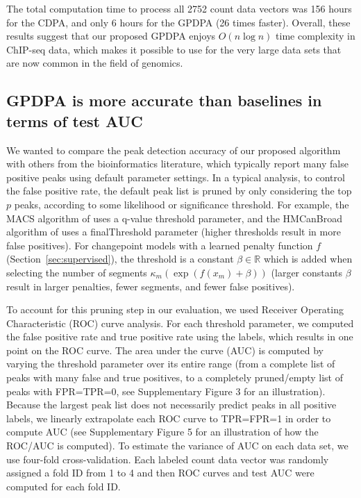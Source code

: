 \documentclass[twoside,11pt]{article}
\newcommand{\RR}{\mathbb R}
\begin{document}
The total computation time to process all 2752 count data vectors was
156 hours for the CDPA, and only 6 hours for the GPDPA (26 times
faster). Overall, these results suggest that our proposed GPDPA enjoys
$O(n\log n)$ time complexity in ChIP-seq data, which makes it possible
to use for the very large data sets that are now common in the field of genomics.


\subsection{GPDPA is more accurate than baselines in terms of test AUC}
\label{sec:test-auc}

We wanted to compare the peak detection accuracy of our proposed
algorithm with others from the bioinformatics literature, which
typically report many false positive peaks using default parameter
settings. 
In a typical analysis, to control the false positive rate, the default
peak list is pruned by only considering the top $p$ peaks, according
to some likelihood or significance threshold. For example, the MACS
algorithm of \citet{MACS} uses a q-value threshold parameter, and the
HMCanBroad algorithm of \citet{HMCan} uses a finalThreshold parameter
(higher thresholds result in more false positives). For changepoint
models with a learned penalty function $f$
(Section~\ref{sec:supervised}), the threshold is a constant $\beta\in\RR$
which is added when selecting the number of segments
$\kappa_m(\exp(f(x_m)+\beta))$ (larger constants $\beta$ result in
larger penalties, fewer segments, and fewer false positives). 

To account for this pruning step in our evaluation, we used Receiver
Operating Characteristic (ROC) curve analysis. For each threshold
parameter, we computed the false positive rate and true positive rate
using the labels, which results in one point on the ROC curve. The
area under the curve (AUC) is computed by varying the threshold
parameter over its entire range (from a complete list of peaks with
many false and true positives, to a completely pruned/empty list of
peaks with FPR=TPR=0, see Supplementary Figure 3 for an illustration).
Because the largest peak list does not necessarily predict peaks in
all positive labels, we linearly extrapolate each ROC curve to
TPR=FPR=1 in order to compute AUC (see Supplementary Figure 5 for an
illustration of how the ROC/AUC is computed). To estimate the variance
of AUC on each data set, we use four-fold cross-validation. Each
labeled count data vector was randomly assigned a fold ID from 1 to 4
and then ROC curves and test AUC were computed for each fold ID.
\end{document}
